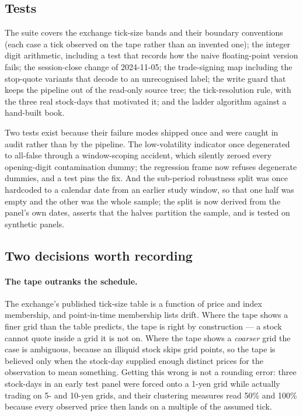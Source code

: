 \subsection{Tests}

The suite covers the exchange tick-size bands and their boundary conventions
(each case a tick observed on the tape rather than an invented one); the integer
digit arithmetic, including a test that records how the naive floating-point
version fails; the session-close change of 2024-11-05; the trade-signing
map including the stop-quote variants that decode to an unrecognised label; the
write guard that keeps the pipeline out of the read-only source tree; the
tick-resolution rule, with the three real stock-days that motivated it; and the
ladder algorithm against a hand-built book.

Two tests exist because their failure modes shipped once and were caught in
audit rather than by the pipeline. The low-volatility indicator once
degenerated to all-false through a window-scoping accident, which silently
zeroed every opening-digit contamination dummy; the regression frame now
refuses degenerate dummies, and a test pins the fix. And the sub-period
robustness split was once hardcoded to a calendar date from an earlier study
window, so that one half was empty and the other was the whole sample; the
split is now derived from the panel's own dates, asserts that the halves
partition the sample, and is tested on synthetic panels.

\subsection{Two decisions worth recording}

\paragraph{The tape outranks the schedule.}
The exchange's published tick-size table is a function of price and index
membership, and point-in-time membership lists drift. Where the tape shows a
finer grid than the table predicts, the tape is right by construction --- a stock
cannot quote inside a grid it is not on. Where the tape shows a \emph{coarser}
grid the case is ambiguous, because an illiquid stock skips grid points, so the
tape is believed only when the stock-day supplied enough distinct prices for the
observation to mean something. Getting this wrong is not a rounding error: three
stock-days in an early test panel were forced onto a 1-yen grid while actually
trading on 5- and 10-yen grids, and their clustering measures read 50\% and 100\%
because every observed price then lands on a multiple of the assumed tick.

